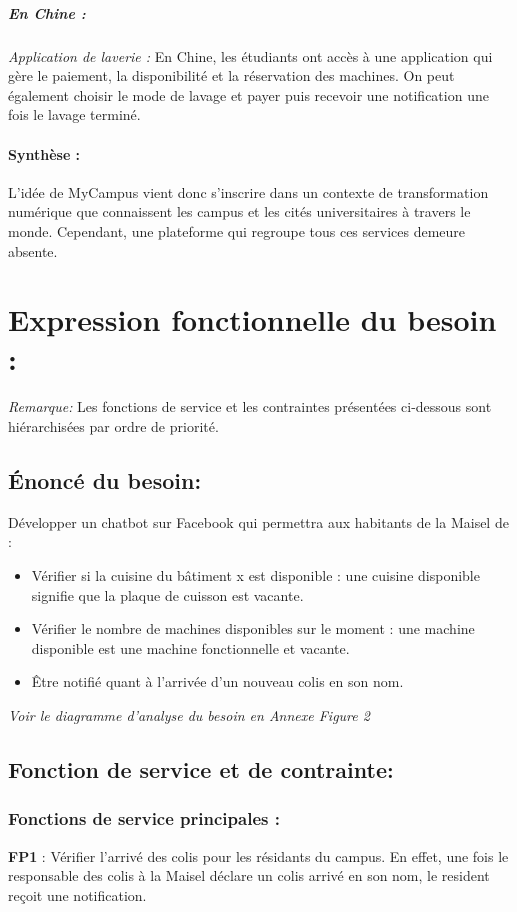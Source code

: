 \documentclass[12pt]{report}
\begin{document}
\subparagraph{En Chine : }

\textit{Application de laverie :} En Chine, les étudiants ont accès à une application qui gère le paiement, la disponibilité et la réservation des machines. On peut également choisir le mode de lavage et payer puis recevoir une notification une fois le lavage terminé.

\paragraph{Synthèse : }

L’idée de MyCampus vient donc s’inscrire dans un contexte de transformation numérique que connaissent les campus et les cités universitaires à travers le monde.
Cependant, une plateforme qui regroupe tous ces services demeure absente. 

\section{Expression fonctionnelle du besoin : }

\textit{Remarque:} 
Les fonctions de service et les contraintes présentées ci-dessous sont hiérarchisées par ordre de priorité.
\subsection{Énoncé du besoin: }

Développer un chatbot sur Facebook qui permettra aux habitants de la Maisel de :  
\begin{itemize}
\item Vérifier si la cuisine du bâtiment x est disponible : une cuisine disponible signifie que la plaque de cuisson est vacante.
\item Vérifier le nombre de machines disponibles sur le moment : une machine disponible est une machine fonctionnelle et vacante.
\item Être notifié quant à l'arrivée d’un nouveau colis en son nom.
\end{itemize}
\medbreak
\textit{Voir le diagramme d'analyse du besoin en Annexe Figure 2}
\subsection{Fonction de service et de contrainte: } 
\subsubsection{Fonctions de service principales : }
\textbf{FP1} : Vérifier l’arrivé des colis pour les résidants du campus. En effet, une fois le responsable des colis à la Maisel déclare un colis arrivé en son nom, le resident reçoit une notification.
\end{document}
